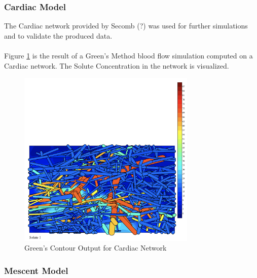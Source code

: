 

\subsubsection*{Cardiac Model}

The Cardiac network provided by Secomb (?) was used for further simulations and to validate the produced data.\\
\\Figure \ref{fig:Contour_Cardiac1}  is the result of a Green's Method blood flow simulation computed on a Cardiac network. The Solute Concentration in the network is visualized.\\
\begin{figure}[h]
\centering
\includegraphics[width=85mm]{Contour_Cardiac}
\caption{\footnotesize Green's Contour Output for Cardiac Network}
\label{fig:Contour_Cardiac1}
\end{figure}

\subsubsection*{Mescent Model}

